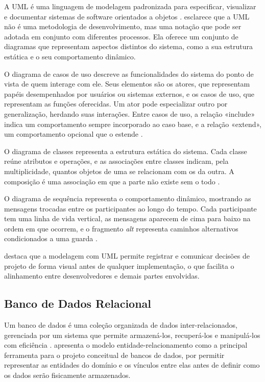 A UML é uma linguagem de modelagem padronizada para especificar, visualizar e documentar sistemas de software orientados a objetos \cite{bezerra2007}.  esclarece que a UML não é uma metodologia de desenvolvimento, mas uma notação que pode ser adotada em conjunto com diferentes processos. Ela oferece um conjunto de diagramas que representam aspectos distintos do sistema, como a sua estrutura estática e o seu comportamento dinâmico.

O diagrama de casos de uso descreve as funcionalidades do sistema do ponto de vista de quem interage com ele. Seus elementos são os atores, que representam papéis desempenhados por usuários ou sistemas externos, e os casos de uso, que representam as funções oferecidas. Um ator pode especializar outro por generalização, herdando suas interações. Entre casos de uso, a relação «include» indica um comportamento sempre incorporado ao caso base, e a relação «extend», um comportamento opcional que o estende \cite{bezerra2007}.

O diagrama de classes representa a estrutura estática do sistema. Cada classe reúne atributos e operações, e as associações entre classes indicam, pela multiplicidade, quantos objetos de uma se relacionam com os da outra. A composição é uma associação em que a parte não existe sem o todo \cite{larman2007}.

O diagrama de sequência representa o comportamento dinâmico, mostrando as mensagens trocadas entre os participantes ao longo do tempo. Cada participante tem uma linha de vida vertical, as mensagens aparecem de cima para baixo na ordem em que ocorrem, e o fragmento \textit{alt} representa caminhos alternativos condicionados a uma guarda \cite{larman2007}.

 destaca que a modelagem com UML permite registrar e comunicar decisões de projeto de forma visual antes de qualquer implementação, o que facilita o alinhamento entre desenvolvedores e demais partes envolvidas.
\subsection{Banco de Dados Relacional}
\label{sec:bd}

Um banco de dados é uma coleção organizada de dados inter-relacionados, gerenciada por um sistema que permite armazená-los, recuperá-los e manipulá-los com eficiência \cite{heuser2009}.  apresenta o modelo entidade-relacionamento como a principal ferramenta para o projeto conceitual de bancos de dados, por permitir representar as entidades do domínio e os vínculos entre elas antes de definir como os dados serão fisicamente armazenados.

